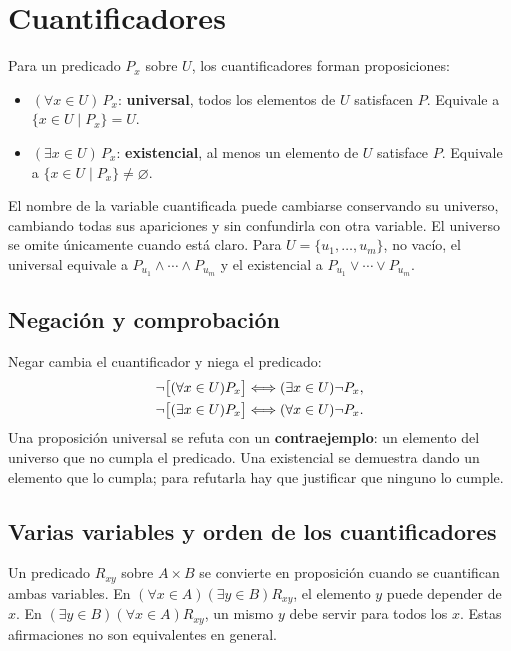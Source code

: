 \newpage
\section{Cuantificadores}
\label{sec:cuantificadores}

Para un predicado $P_x$ sobre $U$, los cuantificadores forman proposiciones:
\begin{itemize}
 \item $(\forall x\in U)\,P_x$: \textbf{universal}, todos los elementos
       de $U$ satisfacen $P$. Equivale a $\{x\in U\mid P_x\}=U$.
 \item $(\exists x\in U)\,P_x$: \textbf{existencial}, al menos un
       elemento de $U$ satisface $P$. Equivale a
       $\{x\in U\mid P_x\}\ne\varnothing$.
\end{itemize}
El nombre de la variable cuantificada puede cambiarse conservando su
universo, cambiando todas sus apariciones y sin confundirla con otra
variable. El universo se omite únicamente cuando está claro.
Para $U=\{u_1,\ldots,u_m\}$, no vacío, el universal equivale a
$P_{u_1}\wedge\cdots\wedge P_{u_m}$ y el existencial a
$P_{u_1}\vee\cdots\vee P_{u_m}$.

\subsection*{Negación y comprobación}

Negar cambia el cuantificador y niega el predicado:
\begin{align*}
 \neg\bigl[(\forall x\in U)P_x\bigr]
   &\Longleftrightarrow(\exists x\in U)\neg P_x,\\
 \neg\bigl[(\exists x\in U)P_x\bigr]
   &\Longleftrightarrow(\forall x\in U)\neg P_x.
\end{align*}
Una proposición universal se refuta con un \textbf{contraejemplo}:
un elemento del universo que no cumpla el predicado. Una existencial
se demuestra dando un elemento que lo cumpla; para refutarla hay que
justificar que ninguno lo cumple.

\subsection*{Varias variables y orden de los cuantificadores}

Un predicado $R_{xy}$ sobre $A\times B$ se convierte en proposición
cuando se cuantifican ambas variables. En
$(\forall x\in A)(\exists y\in B)R_{xy}$, el elemento $y$ puede
depender de $x$. En $(\exists y\in B)(\forall x\in A)R_{xy}$, un mismo
$y$ debe servir para todos los $x$. Estas afirmaciones no son
equivalentes en general.

